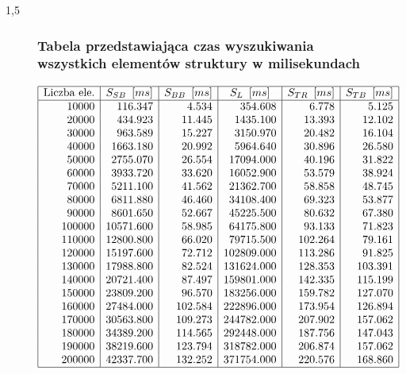\documentclass[polish,polish,a4paper]{article}
\begin{document}
\begin{spacing}{1,5}
\begin{figure}[H]
	\subsubsection*{Tabela przedstawiająca czas wyszukiwania wszystkich elementów struktury w milisekundach}
	\centering
	\begin{equation*}
	\begin{array}{|r|r|r|r|r|r|}
	\hline
	\multicolumn{1}{|c|}{$Liczba ele.$}&\multicolumn{1}{c|}{S_{SB}\enskip[ms]}&\multicolumn{1}{c|}{S_{BB}\enskip[ms]}&\multicolumn{1}{c|}{S_{L}\enskip[ms]}&\multicolumn{1}{c|}{S_{TR}\enskip[ms]}&\multicolumn{1}{c|}{S_{TB}\enskip[ms]}\\ \hline
10000&116.347&4.534&354.608&6.778&5.125\\
20000&434.923&11.445&1435.100&13.393&12.102\\
30000&963.589&15.227&3150.970&20.482&16.104\\
40000&1663.180&20.992&5964.640&30.896&26.580\\
50000&2755.070&26.554&17094.000&40.196&31.822\\
60000&3933.720&33.620&16052.900&53.579&38.924\\
70000&5211.100&41.562&21362.700&58.858&48.745\\
80000&6811.880&46.460&34108.400&69.323&53.877\\
90000&8601.650&52.667&45225.500&80.632&67.380\\
100000&10571.600&58.985&64175.800&93.133&71.823\\
110000&12800.800&66.020&79715.500&102.264&79.161\\
120000&15197.600&72.712&102809.000&113.286&91.825\\
130000&17988.800&82.524&131624.000&128.353&103.391\\
140000&20721.400&87.497&159801.000&142.335&115.199\\
150000&23809.200&96.570&183256.000&159.782&127.070\\
160000&27484.000&102.584&222896.000&173.954&126.894\\
170000&30563.800&109.273&244782.000&207.902&157.062\\
180000&34389.200&114.565&292448.000&187.756&147.043\\
190000&38219.600&123.794&318782.000&206.874&157.062\\
200000&42337.700&132.252&371754.000&220.576&168.860\\\hline
	\end{array}
	\end{equation*}
\end{figure}
\end{spacing}
	
\end{document}
